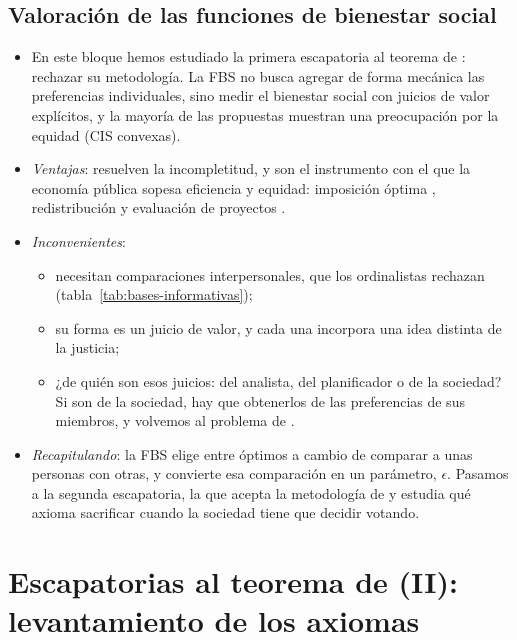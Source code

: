 \documentclass[11pt]{article}
\begin{document}
\subsection{Valoración de las funciones de bienestar social}\label{sec:valoracion-fbs}

\begin{itemize}
\item En este bloque hemos estudiado la primera escapatoria al teorema de : rechazar su metodología. La FBS no busca agregar de forma mecánica las preferencias individuales, sino medir el bienestar social con juicios de valor explícitos, y la mayoría de las propuestas muestran una preocupación por la equidad (CIS convexas).
\item \emph{Ventajas}: resuelven la incompletitud, y son el instrumento con el que la economía pública sopesa eficiencia y equidad: imposición óptima , redistribución  y evaluación de proyectos .
\item \emph{Inconvenientes}:
  \begin{itemize}
  \item necesitan comparaciones interpersonales, que los ordinalistas rechazan (tabla~\ref{tab:bases-informativas});
  \item su forma es un juicio de valor, y cada una incorpora una idea distinta de la justicia;
  \item ¿de quién son esos juicios: del analista, del planificador o de la sociedad? Si son de la sociedad, hay que obtenerlos de las preferencias de sus miembros, y volvemos al problema de .
  \end{itemize}
\item \emph{Recapitulando}: la FBS elige entre óptimos a cambio de comparar a unas personas con otras, y  convierte esa comparación en un parámetro, $\epsilon$. Pasamos a la segunda escapatoria, la que acepta la metodología de  y estudia qué axioma sacrificar cuando la sociedad tiene que decidir votando.
\end{itemize}


\section{Escapatorias al teorema de  (II):\cortetitulo{} levantamiento de los axiomas}\label{sec:levantamiento}
\end{document}
